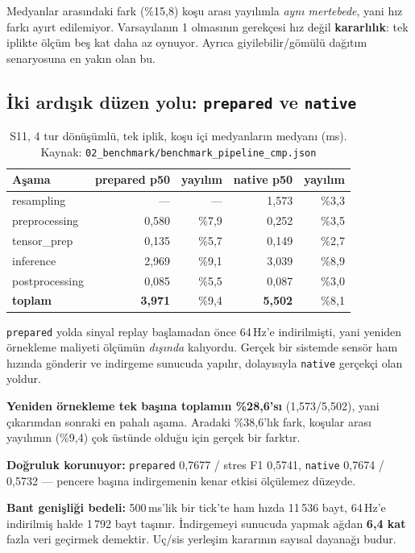 \documentclass[11pt,a4paper]{report}
\newcommand{\ms}{\,ms}
\newcommand{\kod}[1]{\texttt{\small #1}}
\newcommand{\dosya}[1]{\texttt{\footnotesize #1}}
\begin{document}
\begin{bulgu}
Medyanlar arasındaki fark (\%15{,}8) koşu arası yayılımla \emph{aynı
mertebede}, yani hız farkı ayırt edilemiyor. Varsayılanın 1 olmasının gerekçesi
hız değil \textbf{kararlılık}: tek iplikte ölçüm beş kat daha az oynuyor.
Ayrıca giyilebilir/gömülü dağıtım senaryosuna en yakın olan bu.
\end{bulgu}

\subsection{İki ardışık düzen yolu: \kod{prepared} ve \kod{native}}

\begin{table}[H]
\centering\small
\begin{tabular}{@{}lrrrr@{}}
\toprule
\textbf{Aşama} & \textbf{prepared p50} & \textbf{yayılım} & \textbf{native p50} & \textbf{yayılım} \\
\midrule
resampling      & ---      & ---        & 1{,}573 & \%3{,}3 \\
preprocessing   & 0{,}580  & \%7{,}9    & 0{,}252 & \%3{,}5 \\
tensor\_prep    & 0{,}135  & \%5{,}7    & 0{,}149 & \%2{,}7 \\
inference       & 2{,}969  & \%9{,}1    & 3{,}039 & \%8{,}9 \\
postprocessing  & 0{,}085  & \%5{,}5    & 0{,}087 & \%3{,}0 \\
\midrule
\textbf{toplam} & \textbf{3{,}971} & \%9{,}4 & \textbf{5{,}502} & \%8{,}1 \\
\bottomrule
\end{tabular}
\caption{S11, 4 tur dönüşümlü, tek iplik, koşu içi medyanların medyanı (ms).
Kaynak: \dosya{02\_benchmark/benchmark\_pipeline\_cmp.json}}
\end{table}

\begin{bulgu}
\kod{prepared} yolda sinyal replay başlamadan önce 64\,Hz'e indirilmişti, yani
yeniden örnekleme maliyeti ölçümün \emph{dışında} kalıyordu. Gerçek bir sistemde
sensör ham hızında gönderir ve indirgeme sunucuda yapılır, dolayısıyla
\kod{native} gerçekçi olan yoldur.

\textbf{Yeniden örnekleme tek başına toplamın \%28{,}6'sı} (1{,}573/5{,}502),
yani çıkarımdan sonraki en pahalı aşama. Aradaki \%38{,}6'lık fark, koşular
arası yayılımın (\%9{,}4) çok üstünde olduğu için gerçek bir farktır.

\textbf{Doğruluk korunuyor:} \kod{prepared} 0{,}7677 / stres F1 0{,}5741,
\kod{native} 0{,}7674 / 0{,}5732 --- pencere başına indirgemenin kenar etkisi
ölçülemez düzeyde.

\textbf{Bant genişliği bedeli:} 500\ms'lik bir tick'te ham hızda 11\,536 bayt,
64\,Hz'e indirilmiş halde 1\,792 bayt taşınır. İndirgemeyi sunucuda yapmak
ağdan \textbf{6{,}4 kat} fazla veri geçirmek demektir. Uç/sis yerleşim kararının
sayısal dayanağı budur.
\end{bulgu}
\end{document}
